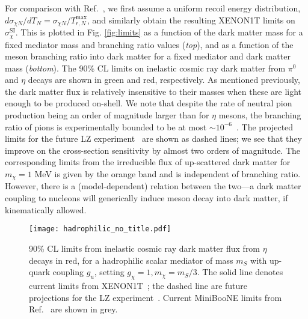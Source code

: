 For comparison with Ref.~\cite{Bringmann:2018cvk}, we first assume a uniform recoil energy distribution, $d\sigma_{\chi N}/dT_N = \sigma_{\chi N} / T_{r,N}^{\mathrm{max}}$, and similarly obtain the resulting XENON1T limits on $\sigma_\chi^{\mathrm{SI}}$. This is plotted in Fig. \ref{fig:limits} as a function of the dark matter mass for a fixed mediator mass and branching ratio values (\textit{top}), and as a function of the meson branching ratio into dark matter for a fixed mediator and dark matter mass (\textit{bottom}). The 90\% CL limits on inelastic cosmic ray dark matter from $\pi^0$ and $\eta$ decays are shown in green and red, respectively. As mentioned previously, the dark matter flux is relatively insensitive to their masses when these are light enough to be produced on-shell. We note that despite the rate of neutral pion production being an order of magnitude larger than for $\eta$ mesons, the branching ratio of pions is experimentally bounded to be at most $\sim 10^{-6}$~\cite{Tanabashi:2018oca}. The projected limits for the future LZ experiment~\cite{Akerib:2018lyp} are shown as dashed lines; we see that they improve on the cross-section sensitivity by almost two orders of magnitude. The corresponding limits from the irreducible flux of up-scattered dark matter for $m_\chi = 1$ MeV is given by the orange band and is independent of branching ratio. However, there is a (model-dependent) relation between the two---a dark matter coupling to nucleons will generically induce meson decay into dark matter, if kinematically allowed.

\begin{figure}
\begin{center}
\texttt{[image: hadrophilic\_no\_title.pdf]}
\end{center}
\caption{90\% CL limits from inelastic cosmic ray dark matter flux from $\eta$ decays in red, for a hadrophilic scalar mediator of mass $m_S$ with up-quark coupling $g_u$, setting $g_\chi=1, m_\chi = m_S/3$. The solid line denotes current limits from XENON1T~\cite{Aprile:2018dbl}; the dashed line are future projections for the LZ experiment~\cite{Akerib:2018lyp}. Current MiniBooNE limits from Ref.~\cite{Aguilar-Arevalo:2018wea} are shown in grey.
\label{fig:hadrophilic}}
\end{figure}

